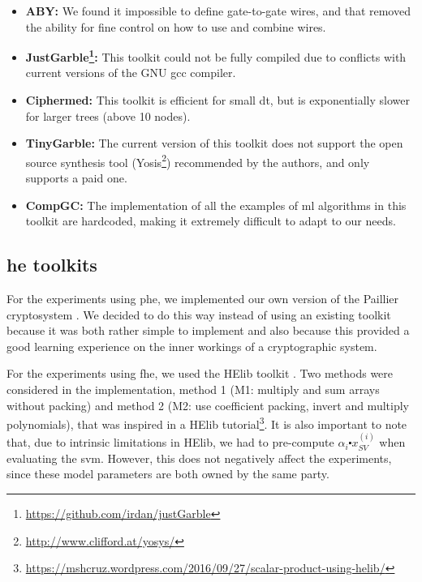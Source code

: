 \begin{itemize}
    
    \item\textbf{ABY\cite{demmler2015aby}:} We found it impossible to define gate-to-gate wires, and that removed the ability for fine control on how to use and combine wires.

    \item\textbf{JustGarble\footnote{\url{https://github.com/irdan/justGarble}}:} This toolkit could not be fully compiled due to conflicts with current versions of the GNU gcc compiler.

    \item\textbf{Ciphermed\cite{bost2015machine}:} This toolkit is efficient for small \ac{dt}, but is exponentially slower for larger trees (above 10 nodes).

    \item\textbf{TinyGarble\cite{songhori2015tinygarble}:} The current version of this toolkit does not support the open source synthesis tool (Yosis\footnote{\url{http://www.clifford.at/yosys/}}) recommended by the authors, and only supports a paid one.

    \item\textbf{CompGC\cite{groce2016compgc}:} The implementation of all the examples of \ac{ml} algorithms in this toolkit are hardcoded, making it extremely difficult to adapt to our needs.

\end{itemize}

\subsection{\acl{he} toolkits}

For the experiments using \ac{phe}, we implemented our own version of the Paillier cryptosystem \cite{paillier1999public}. We decided to do this way instead of using an existing toolkit because it was both rather simple to implement and also because this provided a good learning experience on the inner workings of a cryptographic system.

For the experiments using \ac{fhe}, we used the HElib toolkit \cite{halevi2014helib}. Two methods were considered in the implementation, method 1 (M1: multiply and sum arrays without packing) and method 2 (M2: use coefficient packing, invert and multiply polynomials), that was inspired in a HElib tutorial\footnote{\url{https://mshcruz.wordpress.com/2016/09/27/scalar-product-using-helib/}}. It is also important to note that, due to intrinsic limitations in HElib, we had to pre-compute $\alpha_i\centerdot x_{SV}^{(i)}$ when evaluating the \ac{svm}. However, this does not negatively affect the experiments, since these model parameters are both owned by the same party.



